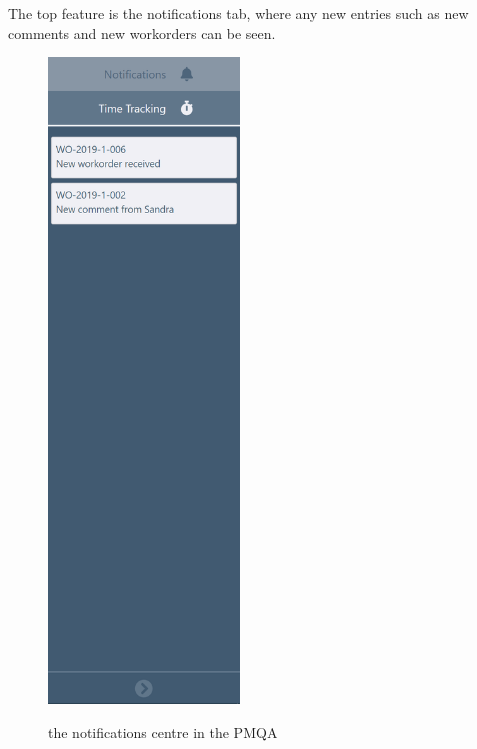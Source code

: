{{{The top feature is the notifications tab, where any new entries such as new comments and new workorders can be seen.
\begin{figure}[H]
	\centering
	\includegraphics[width=2in]{pmqa-notifications.png}\\
	\caption{the notifications centre in the PMQA}
	\label{fig:tobias}
\end{figure}

}}}
